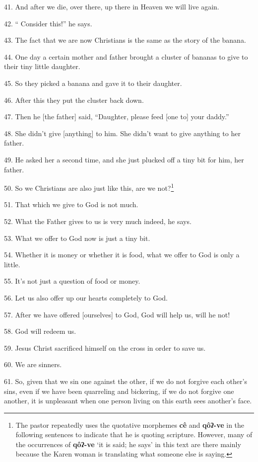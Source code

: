 41. And after we die, over there, up there in Heaven we will live again.

42. `` Consider this!'' he says.

43. The fact that we are now Christians is the same as the story of the banana.

44. One day a certain mother and father brought a cluster of bananas to give to
their tiny little daughter.

45. So they picked a banana and gave it to their daughter.

46. After this they put the cluster back down.

47. Then he [the father] said, ``Daughter, please feed [one to] your daddy.''

48. She didn't give [anything] to him. She didn't want to give anything to her
father.

49. He asked her a second time, and she just plucked off a tiny bit for him, her
father.

50. So we Christians are also just like this, are we not?\footnote{The pastor repeatedly uses the quotative morphemes \textbf{cê} and \textbf{qôʔ-ve} in the following sentences to indicate that he is quoting scripture. However, many of the occurrences of \textbf{qôʔ-ve} `it is said; he says' in this text are there mainly because the Karen woman is translating what someone else is saying.}

51. That which we give to God is not much.

52. What the Father gives to us is very much indeed, he says.

53. What we offer to God now is just a tiny bit.

54. Whether it is money or whether it is food, what we offer to God is only a little.

55. It's not just a question of food or money.

56. Let us also offer up our hearts completely to God.

57. After we have offered [ourselves] to God, God will help us, will he not!

58. God will redeem us.

59. Jesus Christ sacrificed himself on the cross in order to save us.

60. We are sinners.

61. So, given that we sin one against the other, if we do not forgive each other's
sins, even if we have been quarreling and bickering, if we do not forgive one another,
it is unpleasant when one person living on this earth sees another's face.

